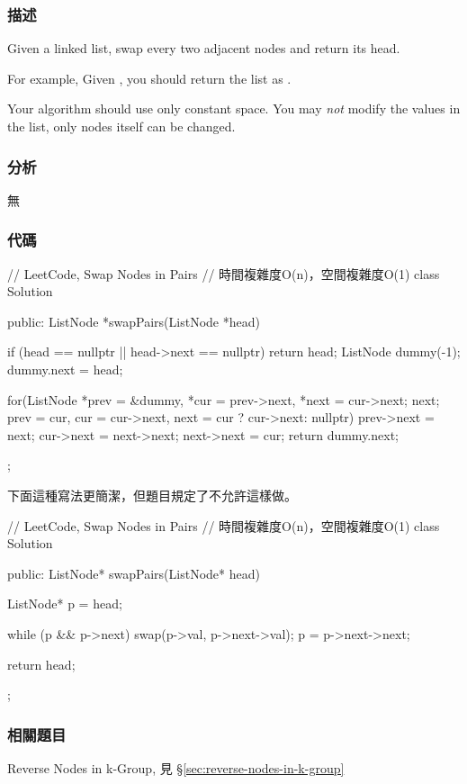 \subsubsection{描述}
Given a linked list, swap every two adjacent nodes and return its head.

For example,
Given , you should return the list as .

Your algorithm should use only constant space. You may \emph{not} modify the values in the list, only nodes itself can be changed.


\subsubsection{分析}
無


\subsubsection{代碼}
\begin{Code}
// LeetCode, Swap Nodes in Pairs
// 時間複雜度O(n)，空間複雜度O(1)
class Solution {
public:
    ListNode *swapPairs(ListNode *head) {
        if (head == nullptr || head->next == nullptr) return head;
        ListNode dummy(-1);
        dummy.next = head;

        for(ListNode *prev = &dummy, *cur = prev->next, *next = cur->next;
                next;
                prev = cur, cur = cur->next, next = cur ? cur->next: nullptr) {
            prev->next = next;
            cur->next = next->next;
            next->next = cur;
        }
        return dummy.next;
    }
};
\end{Code}

下面這種寫法更簡潔，但題目規定了不允許這樣做。
\begin{Code}
// LeetCode, Swap Nodes in Pairs
// 時間複雜度O(n)，空間複雜度O(1)
class Solution {
public:
    ListNode* swapPairs(ListNode* head) {
        ListNode* p = head;

        while (p && p->next) {
            swap(p->val, p->next->val);
            p = p->next->next;
        }

        return head;
    }
};
\end{Code}

\subsubsection{相關題目}

\begindot
\item Reverse Nodes in k-Group, 見 \S \ref{sec:reverse-nodes-in-k-group}
\myenddot


